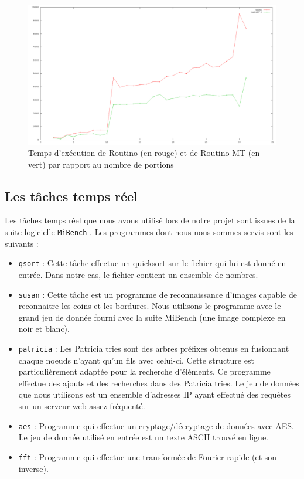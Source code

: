 \begin{figure}[H]
\centering
\includegraphics[scale=0.27]{include/speedup.png}
\caption{Temps d'exécution de Routino (en rouge) et de Routino MT (en vert) par
rapport au nombre de portions}
\label{fig:speedup}
\end{figure}

\subsection{Les tâches temps réel}

Les tâches temps réel que nous avons utilisé lors de notre projet sont issues 
de la suite logicielle \texttt{MiBench} \cite{guthaus_mibench:_2001}. Les 
programmes dont nous nous sommes servis sont les suivants : 

\begin{itemize}
\renewcommand{\labelitemi}{$\bullet$}
\item \texttt{qsort} : Cette tâche effectue un quicksort sur le fichier qui lui 
est donné en entrée. Dans notre cas, le fichier contient un ensemble de nombres.
\item \texttt{susan} : Cette tâche est un programme de reconnaissance d'images 
capable de reconnaitre les coins et les bordures. Nous utilisons le programme 
avec le grand jeu de donnée fourni avec la suite MiBench (une image complexe 
en noir et blanc).
\item \texttt{patricia} : Les Patricia tries sont des arbres préfixes obtenus 
en fusionnant chaque noeuds n'ayant qu'un fils avec celui-ci. Cette structure 
est particulièrement adaptée pour la recherche d'éléments. Ce programme effectue
des ajouts et des recherches dans des Patricia tries. Le jeu de données que
nous utilisons est un ensemble d'adresses IP ayant effectué des requêtes sur un
serveur web assez fréquenté.
\item \texttt{aes} : Programme qui effectue un cryptage/décryptage de données 
avec AES. Le jeu de donnée utilisé en entrée est un texte ASCII trouvé en ligne.
\item \texttt{fft} : Programme qui effectue une transformée de Fourier rapide (et 
son inverse). 
\end{itemize}
